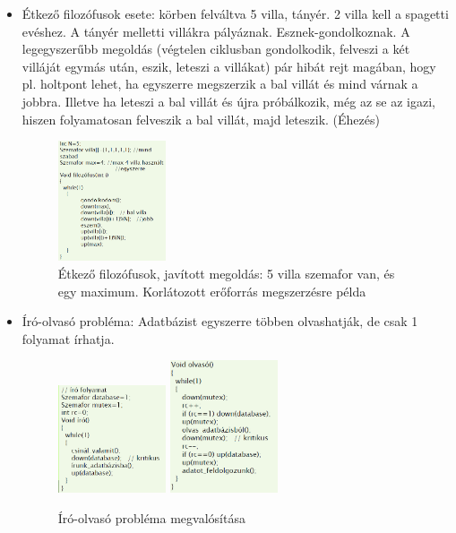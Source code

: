 \documentclass[margin=0px]{article}
\begin{document}
\begin{itemize}
    \item Étkező filozófusok esete: körben felváltva 5 villa, tányér. 2 villa kell a spagetti
          evéshez. A tányér melletti villákra pályáznak. Esznek-gondolkoznak. A legegyszerűbb megoldás (végtelen ciklusban gondolkodik, felveszi a két villáját egymás után, eszik, leteszi a villákat) pár hibát rejt magában, hogy pl. holtpont lehet, ha egyszerre megszerzik a bal villát és mind várnak a jobbra. Illetve ha leteszi a bal villát és újra próbálkozik, még az
          se az igazi, hiszen folyamatosan felveszik a bal villát, majd leteszik. (Éhezés)
          \begin{figure}[H]
              \centering
              \includegraphics[width=0.3\textwidth]{img/filo.png}
              \caption{Étkező filozófusok, javított megoldás: 5 villa szemafor van, és egy maximum. Korlátozott erőforrás megszerzésre példa}
          \end{figure}
    \item Író-olvasó probléma: Adatbázist egyszerre többen olvashatják, de csak 1 folyamat írhatja.
          \begin{figure}[H]
              \centering
              \includegraphics[width=0.3\textwidth]{img/iro.png}
              \includegraphics[width=0.3\textwidth]{img/olvaso.png}
              \caption{Író-olvasó probléma megvalósítása}
          \end{figure}
\end{itemize}
\end{document}
